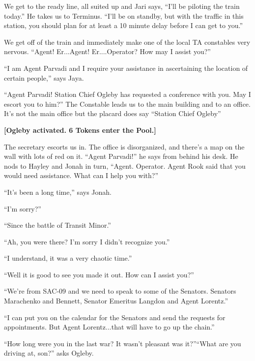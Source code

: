 
We get to the ready line, all suited up and Jari says, ``I'll be piloting the train today.''  He takes us to Terminus.  ``I'll be on standby, but with the traffic in this station, you should plan for at least a 10 minute delay before I can get to you.''



We get off of the train and immediately make one of the local TA constables very nervous.  ``Agent!  Er...Agent!  Er....Operator?  How may I assist you?''

``I am Agent Parvadi and I require your assistance in ascertaining the location of certain people,'' says Jaya.

``Agent Parvadi!  Station Chief Ogleby has requested a conference with you.  May I escort you to him?''  The Constable leads us to the main building and to an office. It's not the main office but the placard does say ``Station Chief Ogleby''



\textbf{{[}Ogleby activated.  6 Tokens enter the Pool.{]}}



The secretary escorts us in.  The office is disorganized, and there's a map on the wall with lots of red on it.  ``Agent Parvadi!'' he says from behind his desk.  He nods to Hayley and Jonah in turn, ``Agent.  Operator.  Agent Rook said that you would need assistance.  What can I help you with?''

``It's been a long time,'' says Jonah.

``I'm sorry?''

``Since the battle of Transit Minor.'' 

``Ah, you were there?  I'm sorry I didn't recognize you.''

``I understand, it was a very chaotic time.''

``Well it is good to see you made it out.  How can I assist you?''

``We're from SAC-09 and we need to speak to some of the Senators.  Senators Marachenko and Bennett, Senator Emeritus Langdon and Agent Lorentz.''

``I can put you on the calendar for the Senators and send the requests for appointments.  But Agent Lorentz...that will have to go up the chain.''

``How long were you in the last war?  It wasn't pleasant was it?''``What are you driving at, son?'' asks Ogleby.

